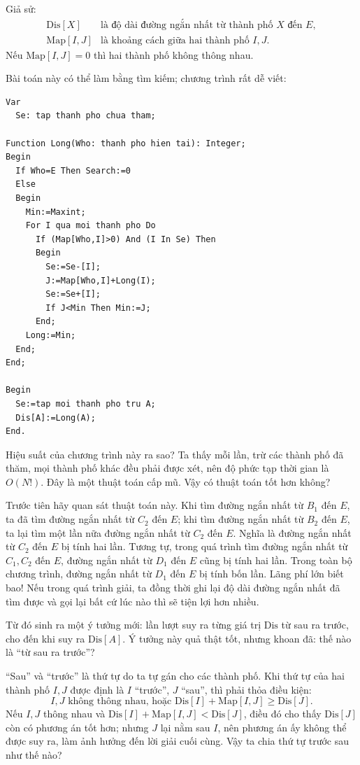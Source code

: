 \documentclass[11pt]{article}
\begin{document}
Giả sử:
\[
\begin{array}{ll}
\mathrm{Dis}[X] & \text{là độ dài đường ngắn nhất từ thành phố } X
                  \text{ đến } E,\\
\mathrm{Map}[I,J] & \text{là khoảng cách giữa hai thành phố } I,J.
\end{array}
\]
Nếu \(\mathrm{Map}[I,J]=0\) thì hai thành phố không thông nhau.

Bài toán này có thể làm bằng tìm kiếm; chương trình rất dễ viết:

\begin{verbatim}
Var
  Se: tap thanh pho chua tham;

Function Long(Who: thanh pho hien tai): Integer;
Begin
  If Who=E Then Search:=0
  Else
  Begin
    Min:=Maxint;
    For I qua moi thanh pho Do
      If (Map[Who,I]>0) And (I In Se) Then
      Begin
        Se:=Se-[I];
        J:=Map[Who,I]+Long(I);
        Se:=Se+[I];
        If J<Min Then Min:=J;
      End;
    Long:=Min;
  End;
End;

Begin
  Se:=tap moi thanh pho tru A;
  Dis[A]:=Long(A);
End.
\end{verbatim}

Hiệu suất của chương trình này ra sao? Ta thấy mỗi lần, trừ các thành phố đã
thăm, mọi thành phố khác đều phải được xét, nên độ phức tạp thời gian là
\(O(N!)\). Đây là một thuật toán cấp mũ. Vậy có thuật toán tốt hơn không?

Trước tiên hãy quan sát thuật toán này. Khi tìm đường ngắn nhất từ \(B_1\) đến
\(E\), ta đã tìm đường ngắn nhất từ \(C_2\) đến \(E\); khi tìm đường ngắn nhất
từ \(B_2\) đến \(E\), ta lại tìm một lần nữa đường ngắn nhất từ \(C_2\) đến
\(E\). Nghĩa là đường ngắn nhất từ \(C_2\) đến \(E\) bị tính hai lần. Tương tự,
trong quá trình tìm đường ngắn nhất từ \(C_1,C_2\) đến \(E\), đường ngắn nhất
từ \(D_1\) đến \(E\) cũng bị tính hai lần. Trong toàn bộ chương trình, đường
ngắn nhất từ \(D_1\) đến \(E\) bị tính bốn lần. Lãng phí lớn biết bao! Nếu
trong quá trình giải, ta đồng thời ghi lại độ dài đường ngắn nhất đã tìm được
và gọi lại bất cứ lúc nào thì sẽ tiện lợi hơn nhiều.

Từ đó sinh ra một ý tưởng mới: lần lượt suy ra từng giá trị \(\mathrm{Dis}\)
từ sau ra trước, cho đến khi suy ra \(\mathrm{Dis}[A]\). Ý tưởng này quả thật
tốt, nhưng khoan đã: thế nào là ``từ sau ra trước''?

``Sau'' và ``trước'' là thứ tự do ta tự gán cho các thành phố. Khi thứ tự của
hai thành phố \(I,J\) được định là \(I\) ``trước'', \(J\) ``sau'', thì phải
thỏa điều kiện:
\[
  I,J \text{ không thông nhau, hoặc }
  \mathrm{Dis}[I]+\mathrm{Map}[I,J]\ge \mathrm{Dis}[J].
\]
Nếu \(I,J\) thông nhau và
\(\mathrm{Dis}[I]+\mathrm{Map}[I,J]<\mathrm{Dis}[J]\), điều đó cho thấy
\(\mathrm{Dis}[J]\) còn có phương án tốt hơn; nhưng \(J\) lại nằm sau \(I\), nên
phương án ấy không thể được suy ra, làm ảnh hưởng đến lời giải cuối cùng. Vậy
ta chia thứ tự trước sau như thế nào?
\end{document}
